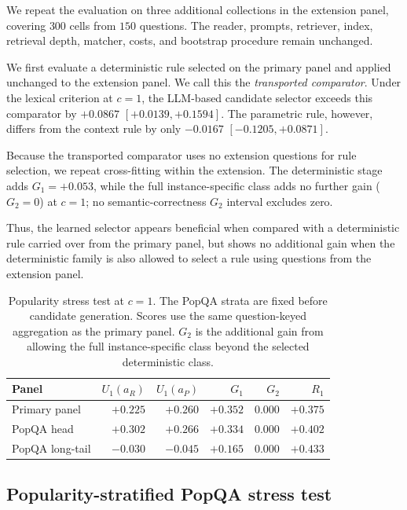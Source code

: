 \documentclass[sigconf]{acmart}
\newcommand{\ar}{a_R}
\newcommand{\ap}{a_P}
\begin{document}
We repeat the evaluation on three additional collections in the
extension panel, covering $300$ cells from $150$ questions. The reader,
prompts, retriever, index, retrieval depth, matcher, costs, and bootstrap
procedure remain unchanged.

We first evaluate a deterministic rule selected on the primary panel
and applied unchanged to the extension panel. We call this the
\emph{transported comparator}. Under the lexical criterion at $c{=}1$,
the LLM-based candidate selector exceeds this comparator by $+0.0867$
$[+0.0139,\allowbreak +0.1594]$. The parametric rule, however, differs
from the context rule by only $-0.0167$
$[-0.1205,\allowbreak +0.0871]$.

Because the transported comparator uses no extension questions for
rule selection, we repeat cross-fitting within the extension.
The deterministic stage adds $G_1=+0.053$, while the full instance-specific
class adds no further gain ($G_2=0$) at $c{=}1$; no semantic-correctness
$G_2$ interval excludes zero.

Thus, the learned selector appears beneficial when compared with a
deterministic rule carried over from the primary panel, but shows no
additional gain when the deterministic family is also allowed to select
a rule using questions from the extension panel.

\begin{table}[t]
\centering
\scriptsize
\setlength{\tabcolsep}{2.5pt}
\caption{Popularity stress test at $c{=}1$. The PopQA strata are fixed
before candidate generation. Scores use the same question-keyed
aggregation as the primary panel. $G_2$ is the additional gain from
allowing the full instance-specific class beyond the selected
deterministic class.}
\label{tab:popqa-popularity}

\begin{tabular}{@{}lrrrrr@{}}
\toprule
Panel & $U_1(\ar)$ & $U_1(\ap)$ & $G_1$ & $G_2$ & $R_1$ \\
\midrule
Primary panel & $+0.225$ & $+0.260$ & $+0.352$ & $0.000$ & $+0.375$ \\
PopQA head & $+0.302$ & $+0.266$ & $+0.334$ & $0.000$ & $+0.402$ \\
PopQA long-tail & $-0.030$ & $-0.045$ & $+0.165$ & $0.000$ & $+0.433$ \\
\bottomrule
\end{tabular}
\end{table}

\subsection{Popularity-stratified PopQA stress test}
\label{sec:res-popqa}
\end{document}
